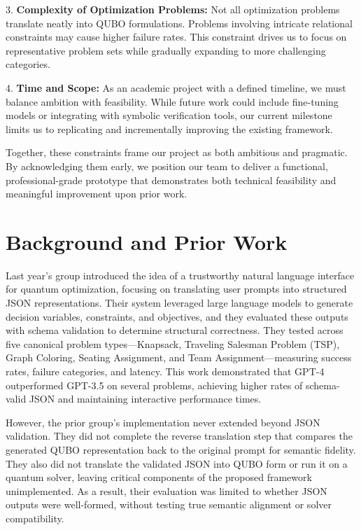 3. \textbf{Complexity of Optimization Problems:} Not all optimization problems translate neatly into QUBO formulations. Problems involving intricate relational constraints may cause higher failure rates. This constraint drives us to focus on representative problem sets while gradually expanding to more challenging categories.  

4. \textbf{Time and Scope:} As an academic project with a defined timeline, we must balance ambition with feasibility. While future work could include fine-tuning models or integrating with symbolic verification tools, our current milestone limits us to replicating and incrementally improving the existing framework.  

Together, these constraints frame our project as both ambitious and pragmatic. By acknowledging them early, we position our team to deliver a functional, professional-grade prototype that demonstrates both technical feasibility and meaningful improvement upon prior work.

\section{Background and Prior Work}

Last year’s group introduced the idea of a trustworthy natural language interface for quantum optimization, focusing on translating user prompts into structured \gls{JSON} representations. Their system leveraged large language models to generate decision variables, constraints, and objectives, and they evaluated these outputs with schema validation to determine structural correctness. They tested across five canonical problem types—Knapsack, Traveling Salesman Problem (TSP), Graph Coloring, Seating Assignment, and Team Assignment—measuring success rates, failure categories, and latency. This work demonstrated that GPT-4 outperformed GPT-3.5 on several problems, achieving higher rates of schema-valid JSON and maintaining interactive performance times.

However, the prior group’s implementation never extended beyond JSON validation. They did not complete the reverse translation step that compares the generated \gls{QUBO} representation back to the original prompt for semantic fidelity. They also did not translate the validated JSON into QUBO form or run it on a quantum solver, leaving critical components of the proposed framework unimplemented. As a result, their evaluation was limited to whether JSON outputs were well-formed, without testing true semantic alignment or solver compatibility.

